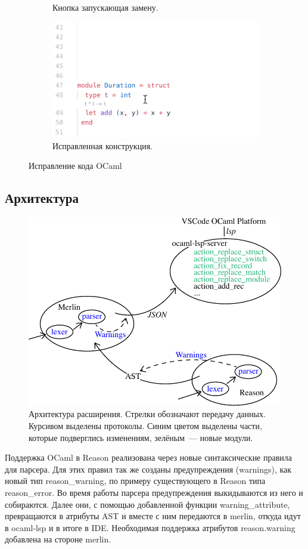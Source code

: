 \begin{figure}[h]
\begin{subfigure}{0.5\textwidth}
		\caption{Кнопка запускающая замену.}
	\end{subfigure}
	\begin{subfigure}{0.5\textwidth}
		\includegraphics[width=\linewidth]{screenshots/04.png}
		\caption{Исправленная конструкция.}
	\end{subfigure}
\caption{Исправление кода OCaml}
\end{figure}

\newpage

\subsection{Архитектура}
\begin{figure}[h]
	\includegraphics[width=\linewidth]{graph.pdf}
\caption{Архитектура расширения. Стрелки обозначают передачу данных. Курсивом выделены протоколы. Синим цветом выделены части, которые подверглись изменениям, зелёным~--- новые модули.}
\end{figure}
Поддержка OCaml в Reason реализована через новые синтаксические правила для парсера. Для этих правил так же созданы предупреждения (warnings), как новый тип reason\_warning, по примеру существующего в Reason типа reason\_error. Во время работы парсера предупреждения выкидываются из него и собираются. Далее они, с помощью добавленной функции warning\_attribute, превращаются в атрибуты AST и вместе с ним передаются в merlin, откуда идут в ocaml-lsp и в итоге в IDE. Необходимая поддержка атрибутов reason.warning добавлена на стороне merlin.

